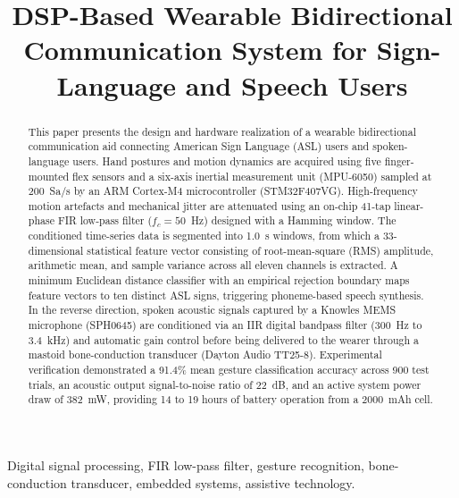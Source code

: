 \documentclass[conference]{IEEEtran}
\begin{document}
\title{DSP-Based Wearable Bidirectional Communication System for Sign-Language and Speech Users}

\author{
}


\maketitle

\begin{abstract}
This paper presents the design and hardware realization of a wearable bidirectional communication aid connecting American Sign Language (ASL) users and spoken-language users. Hand postures and motion dynamics are acquired using five finger-mounted flex sensors and a six-axis inertial measurement unit (MPU-6050) sampled at 200~Sa/s by an ARM Cortex-M4 microcontroller (STM32F407VG). High-frequency motion artefacts and mechanical jitter are attenuated using an on-chip 41-tap linear-phase FIR low-pass filter ($f_c = 50$~Hz) designed with a Hamming window. The conditioned time-series data is segmented into 1.0~s windows, from which a 33-dimensional statistical feature vector consisting of root-mean-square (RMS) amplitude, arithmetic mean, and sample variance across all eleven channels is extracted. A minimum Euclidean distance classifier with an empirical rejection boundary maps feature vectors to ten distinct ASL signs, triggering phoneme-based speech synthesis. In the reverse direction, spoken acoustic signals captured by a Knowles MEMS microphone (SPH0645) are conditioned via an IIR digital bandpass filter (300~Hz to 3.4~kHz) and automatic gain control before being delivered to the wearer through a mastoid bone-conduction transducer (Dayton Audio TT25-8). Experimental verification demonstrated a 91.4\% mean gesture classification accuracy across 900 test trials, an acoustic output signal-to-noise ratio of 22~dB, and an active system power draw of 382~mW, providing 14 to 19 hours of battery operation from a 2000~mAh cell.
\end{abstract}

\begin{IEEEkeywords}
Digital signal processing, FIR low-pass filter, gesture recognition, bone-conduction transducer, embedded systems, assistive technology.
\end{IEEEkeywords}
\end{document}
